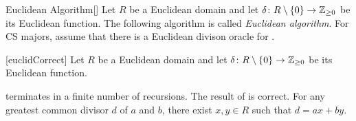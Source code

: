 \documentclass[../modern_algebra_2.tex]{subfiles}
\begin{document}
\begin{Definition}{Euclidean Algorithm}[]
    Let \(R\) be a Euclidean domain and let \(\delta \colon R \setminus \{0\} \to \ZZ_{\ge 0}\)
    be its Euclidean function.
    The following algorithm is called \emph{Euclidean algorithm}.
    For CS majors, assume that there is a Euclidean divison oracle for .

    \vspace*{.5\baselineskip}
    \begin{algorithm}[H]
        \NoCaptionOfAlgo
        \DontPrintSemicolon
        \caption{\textsc{Euclidean Algorithm}}
        \label{alg:euclid}
    \end{algorithm}
\end{Definition}

\begin{Theorem}{}[euclidCorrect]
    Let \(R\) be a Euclidean domain and let \(\delta \colon R \setminus \{0\} \to \ZZ_{\ge 0}\)
    be its Euclidean function.
    \begin{enumerate}[label=(\roman*), ref=\protect{\Cref{th:euclidCorrect} (\roman*)}]
        \ii
         terminates in a finite number of recursions.
        \ii
        The result of  is correct.
        \ii\label{itm:euclidCorrect.iii}
        For any greatest common divisor \(d\) of \(a\) and \(b\), there exist \(x, y \in R\)
        such that \(d = ax + by\).
    \end{enumerate}
\end{Theorem}
\end{document}
